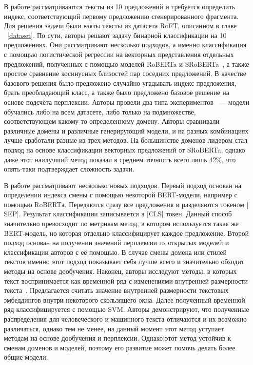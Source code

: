 \label{roft}
В работе \cite{Cutler2021AutomaticDO} рассматриваются тексты из 10 предложений и требуется определить индекс, соответствующий первому предложению сгенерированного фрагмента. Для решения задачи были взяты тексты из датасета RoFT, описанном в главе ~\ref{dataset}. По сути, авторы решают задачу бинарной классификации на 10 предложениях. Они рассматривают несколько подходов, а именно классификация с помощью логистической регрессии на векторных представления отдельных предложений, полученных с помощью моделей RoBERTa и SRoBERTa~\cite{sroberta}, а также простое сравнение косинусных близостей пар соседних предложений. В качестве базового решения было предложено случайно угадывать индекс предложения, брать преобладающий класс, а также было предложено базовое решение на основе подсчёта перплексии. Авторы провели два типа экспериментов ~--- модели обучались либо на всем датасете, либо только на подмножестве, соответствующем какому-то определенному домену. Авторы сравнивали различные домены и различные генерирующий модели, и на разных комбинациях лучше сработали разные из трех методов. На большинстве доменов лидером стал подход на основе классификации векторных предложений от SRoBERTa, однако даже этот наилучший метод показал в среднем точность всего лишь 42\%, что опять-таки подтверждает сложность задачи.


В работе \cite{kushnareva2024aigenerated} рассматривают несколько новых подходов. Первый подход основан на определении индекса смены с помощью некоторой BERT-модели, например с помощью RoBERTа. Передаются сразу все предложения и разделяются токеном $[$SEP$]$. Результат классификации записывается в $[$CLS$]$ токен. Данный способ значительно превосходит по метрикам метод, в котором используется такая же BERT-модель, но которая отдельно классифицирует каждое предложение. 
Второй подход основан на получении значений перплексии из открытых моделей и классификации авторов с её помощью. В случае смены домена или стилей текстов именно этот подход показывает себя лучше всего и значительно обходит методы на основе дообучения.
Наконец, авторы исследуют методы, в которых текст воспринимается как временной ряд с изменениями внутренней размерности текста~\cite{Tulchinskii2023IntrinsicDE}. Предлагается считать значение внутренней размерности текстовых эмбеддингов внутри некоторого скользящего окна. Далее полученный временной ряд классифицируется с помощью SVM. Авторы демонстрируют, что полученные распределения для человеческого и машинного текста отличаются и их возможно различаться, однако тем не менее, на данный момент этот метод уступает методам на основе дообучения и перплексии. Однако этот метод устойчив к сменам доменов и моделей, поэтому его развитие может помочь делать более общие модели.


